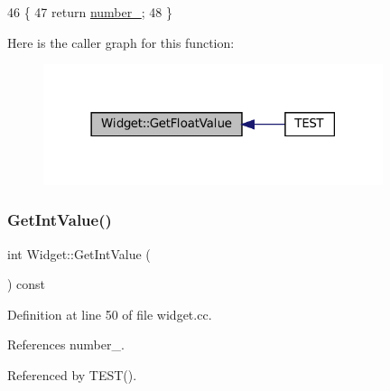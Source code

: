\begin{DoxyCode}
46                                   \{
47   \textcolor{keywordflow}{return} \hyperlink{classWidget_a27a2b3fd66372d5731fa9a6bcaab755b}{number\_};
48 \}
\end{DoxyCode}
Here is the caller graph for this function\+:
\nopagebreak
\begin{figure}[H]
\begin{center}
\leavevmode
\includegraphics[width=282pt]{classWidget_abf639d975e02cabda8132873aca1a333_icgraph}
\end{center}
\end{figure}
\mbox{\label{classWidget_a15e7d0423020a7a98063a749fb97bdd3}} 
\subsubsection{\texorpdfstring{Get\+Int\+Value()}{GetIntValue()}}
{\footnotesize\ttfamily int Widget\+::\+Get\+Int\+Value (\begin{DoxyParamCaption}{ }\end{DoxyParamCaption}) const}



Definition at line 50 of file widget.\+cc.



References number\+\_\+.



Referenced by T\+E\+S\+T().


